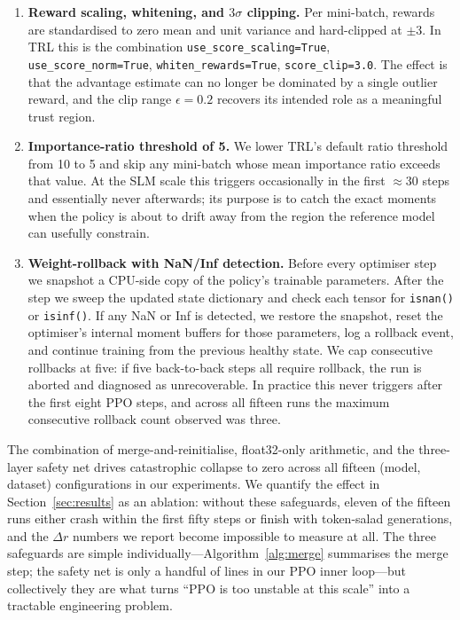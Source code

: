 \documentclass[10pt,twocolumn,letterpaper]{article}
\begin{document}
\begin{enumerate}[leftmargin=*, topsep=2pt, itemsep=2pt]
  \item \textbf{Reward scaling, whitening, and $3\sigma$ clipping.} Per mini-batch, rewards are standardised to zero mean and unit variance and hard-clipped at $\pm 3$. In TRL this is the combination \texttt{use\_score\_scaling=True}, \texttt{use\_score\_norm=True}, \texttt{whiten\_rewards=True}, \texttt{score\_clip=3.0}. The effect is that the advantage estimate can no longer be dominated by a single outlier reward, and the clip range $\epsilon=0.2$ recovers its intended role as a meaningful trust region.
  \item \textbf{Importance-ratio threshold of 5.} We lower TRL's default ratio threshold from 10 to 5 and skip any mini-batch whose mean importance ratio exceeds that value. At the SLM scale this triggers occasionally in the first $\approx$30 steps and essentially never afterwards; its purpose is to catch the exact moments when the policy is about to drift away from the region the reference model can usefully constrain.
  \item \textbf{Weight-rollback with NaN/Inf detection.} Before every optimiser step we snapshot a CPU-side copy of the policy's trainable parameters. After the step we sweep the updated state dictionary and check each tensor for \texttt{isnan()} or \texttt{isinf()}. If any NaN or Inf is detected, we restore the snapshot, reset the optimiser's internal moment buffers for those parameters, log a rollback event, and continue training from the previous healthy state. We cap consecutive rollbacks at five: if five back-to-back steps all require rollback, the run is aborted and diagnosed as unrecoverable. In practice this never triggers after the first eight PPO steps, and across all fifteen runs the maximum consecutive rollback count observed was three.
\end{enumerate}

The combination of merge-and-reinitialise, float32-only arithmetic, and the three-layer safety net drives catastrophic collapse to zero across all fifteen (model, dataset) configurations in our experiments. We quantify the effect in Section~\ref{sec:results} as an ablation: without these safeguards, eleven of the fifteen runs either crash within the first fifty steps or finish with token-salad generations, and the $\Delta r$ numbers we report become impossible to measure at all. The three safeguards are simple individually---Algorithm~\ref{alg:merge} summarises the merge step; the safety net is only a handful of lines in our PPO inner loop---but collectively they are what turns ``PPO is too unstable at this scale'' into a tractable engineering problem.
\end{document}
